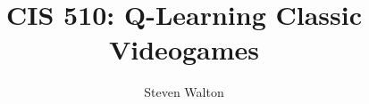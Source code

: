 \documentclass[12pt,letter]{article}
\begin{document}
\title{CIS 510: Q-Learning Classic Videogames}
\author{Steven Walton}
\maketitle


\FloatBarrier

\FloatBarrier

\FloatBarrier

\FloatBarrier

\FloatBarrier





\end{document}
